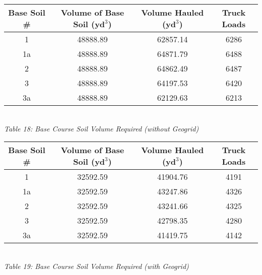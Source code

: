 \documentclass{article}
\begin{document}
\begin{center}
    \vspace{6mm}
    \begin{tabular}{|c|ccc|}
        \hline
        \textbf{Base Soil \#} & \textbf{Volume of Base Soil ($\textbf{yd}^3$)} & \textbf{Volume Hauled ($\textbf{yd}^3$)} & \textbf{Truck Loads}  \\\hline
        1  & 48888.89 & 62857.14 & 6286  \\
        1a & 48888.89 & 64871.79 & 6488  \\
        2  & 48888.89 & 64862.49 & 6487  \\
        3  & 48888.89 & 64197.53 & 6420  \\
        3a & 48888.89 & 62129.63 & 6213\\\hline
    \end{tabular}
    \vspace{3mm}
    \emph{\\Table 18: Base Course Soil Volume Required (without Geogrid)\\}
    \vspace{6mm}
    \begin{tabular}{|c|ccc|}
        \hline
        \textbf{Base Soil \#} & \textbf{Volume of Base Soil ($\textbf{yd}^3$)} & \textbf{Volume Hauled ($\textbf{yd}^3$)} & \textbf{Truck Loads}  \\\hline
        1  & 32592.59 & 41904.76 & 4191  \\
        1a & 32592.59 & 43247.86 & 4326  \\
        2  & 32592.59 & 43241.66 & 4325  \\
        3  & 32592.59 & 42798.35 & 4280  \\
        3a & 32592.59 & 41419.75 & 4142 \\\hline
    \end{tabular}
    \vspace{3mm}
    \emph{\\Table 19: Base Course Soil Volume Required (with Geogrid)\\}


\end{center}
\end{document}
